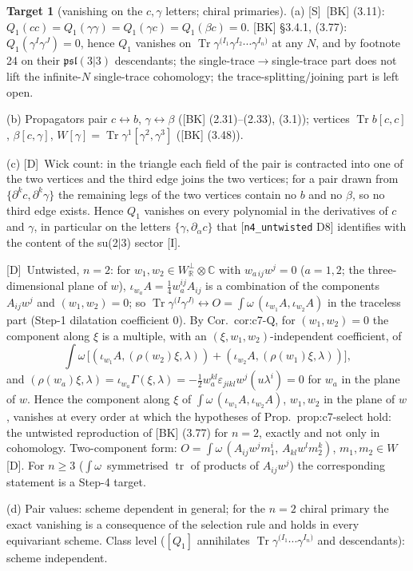 \documentclass[11pt]{article}
\theoremstyle{definition}
\newtheorem{target}{Target}
\newcommand{\Tr}{\operatorname{Tr}}
\newcommand{\tr}{\operatorname{tr}}
\newcommand{\Sl}{\textup{[S]}}
\newcommand{\Dl}{\textup{[D]}}
\newcommand{\Il}{\textup{[I]}}
\begin{document}
\begin{target}[vanishing on the $c,\gamma$ letters; chiral primaries]\label{t:cgamma}
(a) \Sl\ [BK] (3.11): $Q_1(cc)=Q_1(\gamma\gamma)=Q_1(\gamma c)=Q_1(\beta c)=0$. [BK] \S3.4.1, (3.77): $Q_1(\gamma^I\gamma^J)=0$, hence $Q_1$ vanishes on $\Tr\gamma^{(I_1}\gamma^{I_2}\cdots\gamma^{I_n)}$ at any $N$, and by footnote 24 on their $\mathfrak{psl}(3|3)$ descendants; the single-trace$\to$single-trace part does not lift the infinite-$N$ single-trace cohomology; the trace-splitting/joining part is left open.

(b) Propagators pair $c\leftrightarrow b$, $\gamma\leftrightarrow\beta$ ([BK] (2.31)--(2.33), (3.1)); vertices $\Tr b[c,c]$, $\beta[c,\gamma]$, $W[\gamma]=\Tr\gamma^1[\gamma^2,\gamma^3]$ ([BK] (3.48)).

(c) \Dl\ Wick count: in the triangle each field of the pair is contracted into one of the two vertices and the third edge joins the two vertices; for a pair drawn from $\{\partial^kc,\partial^k\gamma\}$ the remaining legs of the two vertices contain no $b$ and no $\beta$, so no third edge exists. Hence $Q_1$ vanishes on every polynomial in the derivatives of $c$ and $\gamma$, in particular on the letters $\{\gamma,\partial_{\dot\alpha}c\}$ that [\texttt{n4\_untwisted} D8] identifies with the content of the su(2$|$3) sector \Il.

\Dl\ Untwisted, $n=2$: for $w_1,w_2\in W^\perp_{\mathbb R}\otimes\mathbb C$ with $w_{a\,ij}w^j=0$ ($a=1,2$; the three-dimensional plane of $w$), $\iota_{w_a}A=\tfrac14w_a^{ij}A_{ij}$ is a combination of the components $A_{ij}w^j$ and $(w_1,w_2)=0$; so $\Tr\gamma^{(I}\gamma^{J)}\leftrightarrow O=\int\omega\,(\iota_{w_1}A,\iota_{w_2}A)$ in the traceless part (Step-1 dilatation coefficient $0$). By Cor.~cor:c7-Q, for $(w_1,w_2)=0$ the component along $\xi$ is a multiple, with an $(\xi,w_1,w_2)$-independent coefficient, of
\[
\int\omega\,\Big[(\iota_{w_1}A,(\rho(w_2)\xi,\lambda))+(\iota_{w_2}A,(\rho(w_1)\xi,\lambda))\Big],
\]
and $(\rho(w_a)\xi,\lambda)=\iota_{w_a}\Gamma(\xi,\lambda)=-\tfrac12w_a^{kl}\varepsilon_{jikl}w^j(u\lambda^i)=0$ for $w_a$ in the plane of $w$. Hence the component along $\xi$ of $\int\omega\,(\iota_{w_1}A,\iota_{w_2}A)$, $w_1,w_2$ in the plane of $w$, vanishes at every order at which the hypotheses of Prop.~prop:c7-select hold: the untwisted reproduction of [BK] (3.77) for $n=2$, exactly and not only in cohomology. Two-component form: $O=\int\omega\,(A_{ij}w^jm_1^i,\,A_{kl}w^lm_2^k)$, $m_1,m_2\in W$ \Dl. For $n\ge3$ ($\int\omega\,$ symmetrised $\tr$ of products of $A_{ij}w^j$) the corresponding statement is a Step-4 target.

(d) Pair values: scheme dependent in general; for the $n=2$ chiral primary the exact vanishing is a consequence of the selection rule and holds in every equivariant scheme. Class level ($[Q_1]$ annihilates $\Tr\gamma^{(I_1}\cdots\gamma^{I_n)}$ and descendants): scheme independent.
\end{target}
\end{document}
